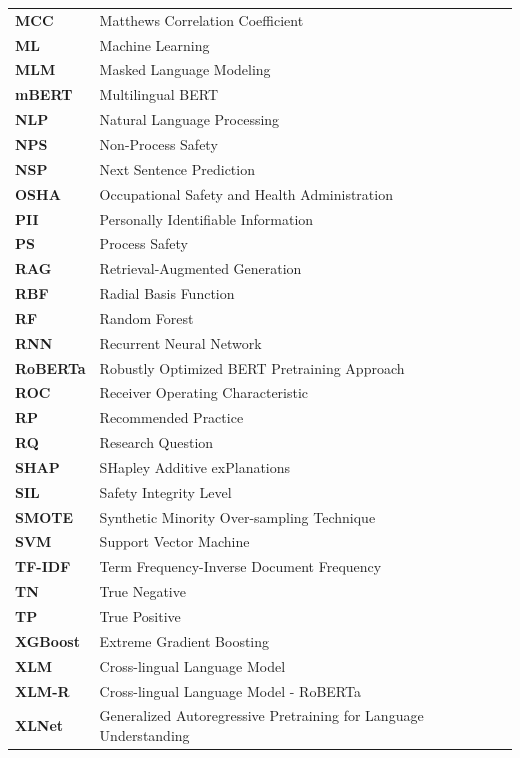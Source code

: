 \documentclass[11pt, titlepage, bibliography=totoc]{scrreprt}
\begin{document}
\begin{tabular}{@{}p{2.5cm}p{12cm}@{}}
\textbf{MCC} & Matthews Correlation Coefficient \\[0.3em]
\textbf{ML} & Machine Learning \\[0.3em]
\textbf{MLM} & Masked Language Modeling \\[0.3em]
\textbf{mBERT} & Multilingual BERT \\[0.3em]
\textbf{NLP} & Natural Language Processing \\[0.3em]
\textbf{NPS} & Non-Process Safety \\[0.3em]
\textbf{NSP} & Next Sentence Prediction \\[0.3em]
\textbf{OSHA} & Occupational Safety and Health Administration \\[0.3em]
\textbf{PII} & Personally Identifiable Information \\[0.3em]
\textbf{PS} & Process Safety \\[0.3em]
\textbf{RAG} & Retrieval-Augmented Generation \\[0.3em]
\textbf{RBF} & Radial Basis Function \\[0.3em]
\textbf{RF} & Random Forest \\[0.3em]
\textbf{RNN} & Recurrent Neural Network \\[0.3em]
\textbf{RoBERTa} & Robustly Optimized BERT Pretraining Approach \\[0.3em]
\textbf{ROC} & Receiver Operating Characteristic \\[0.3em]
\textbf{RP} & Recommended Practice \\[0.3em]
\textbf{RQ} & Research Question \\[0.3em]
\textbf{SHAP} & SHapley Additive exPlanations \\[0.3em]
\textbf{SIL} & Safety Integrity Level \\[0.3em]
\textbf{SMOTE} & Synthetic Minority Over-sampling Technique \\[0.3em]
\textbf{SVM} & Support Vector Machine \\[0.3em]
\textbf{TF-IDF} & Term Frequency-Inverse Document Frequency \\[0.3em]
\textbf{TN} & True Negative \\[0.3em]
\textbf{TP} & True Positive \\[0.3em]
\textbf{XGBoost} & Extreme Gradient Boosting \\[0.3em]
\textbf{XLM} & Cross-lingual Language Model \\[0.3em]
\textbf{XLM-R} & Cross-lingual Language Model - RoBERTa \\[0.3em]
\textbf{XLNet} & Generalized Autoregressive Pretraining for Language Understanding \\[0.3em]
\end{tabular}
\end{document}
